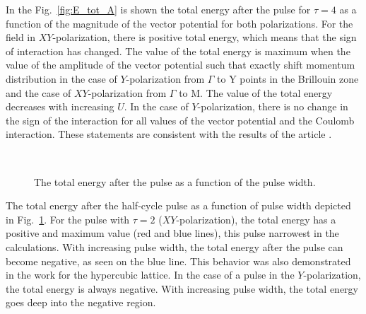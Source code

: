 In the Fig.~\ref{fig:E_tot_A} is shown the total energy after the pulse for $\tau=4$ as a function of the magnitude of the vector potential for both polarizations. For the field in $XY$-polarization, there is positive total energy, which means that the sign of interaction has changed. The value of the total energy is maximum when the value of the amplitude of the vector potential such that exactly shift momentum distribution in the case of $Y$-polarization from $\Gamma$ to Y points in the Brillouin zone and the case of $XY$-polarization from $\Gamma$ to M. The value of the total energy decreases with increasing $U$. In the case of $Y$-polarization, there is no change in the sign of the interaction for all values of the vector potential and the Coulomb interaction. These statements are consistent with the results of the article \citep{PhysRevB.85.155124}.
\begin{figure}[h!]
 \\
\caption{The total energy after the pulse as a function of the pulse width.}
\label{fig:E_tot_tau}
\end{figure}

The total energy after the half-cycle pulse as a function of pulse width depicted in Fig.~\ref{fig:E_tot_tau}. For the pulse with $\tau = 2$ ($XY$-polarization), the total energy has a positive and maximum value (red and blue lines), this pulse narrowest in the calculations. With increasing pulse width, the total energy after the pulse can become negative, as seen on the blue line. This behavior was also demonstrated in the work \citep{PhysRevB.85.155124} for the hypercubic lattice.
In the case of a pulse in the $Y$-polarization, the total energy is always negative. With increasing pulse width, the total energy goes deep into the negative region.

